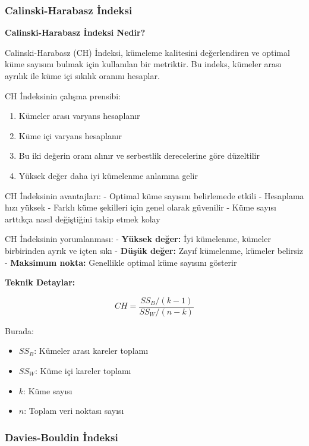 \newpage

\subsubsection{Calinski-Harabasz İndeksi}

\textbf{Calinski-Harabasz İndeksi Nedir?}

Calinski-Harabasz (CH) İndeksi, kümeleme kalitesini değerlendiren ve optimal küme sayısını bulmak için kullanılan bir metriktir. Bu indeks, kümeler arası ayrılık ile küme içi sıkılık oranını hesaplar.

CH İndeksinin çalışma prensibi:
\begin{enumerate}
    \item Kümeler arası varyans hesaplanır
    \item Küme içi varyans hesaplanır  
    \item Bu iki değerin oranı alınır ve serbestlik derecelerine göre düzeltilir
    \item Yüksek değer daha iyi kümelenme anlamına gelir
\end{enumerate}

CH İndeksinin avantajları:
- Optimal küme sayısını belirlemede etkili
- Hesaplama hızı yüksek
- Farklı küme şekilleri için genel olarak güvenilir
- Küme sayısı arttıkça nasıl değiştiğini takip etmek kolay

CH İndeksinin yorumlanması:
- \textbf{Yüksek değer:} İyi kümelenme, kümeler birbirinden ayrık ve içten sıkı
- \textbf{Düşük değer:} Zayıf kümelenme, kümeler belirsiz
- \textbf{Maksimum nokta:} Genellikle optimal küme sayısını gösterir

\textbf{Teknik Detaylar:}

\begin{equation}
CH = \frac{SS_B / (k-1)}{SS_W / (n-k)}
\label{eq:calinski_harabasz}
\end{equation}

Burada:
\begin{itemize}
    \item $SS_B$: Kümeler arası kareler toplamı
    \item $SS_W$: Küme içi kareler toplamı
    \item $k$: Küme sayısı
    \item $n$: Toplam veri noktası sayısı
\end{itemize}

\newpage

\subsubsection{Davies-Bouldin İndeksi}

